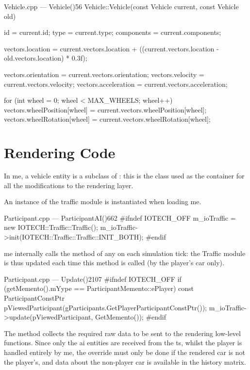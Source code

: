 \begin{codelist}{Vehicle.cpp --- Vehicle()}{56}
Vehicle::Vehicle(const Vehicle current, const Vehicle old) {
    id         = current.id;
    type       = current.type;
    components = current.components;

    vectors.location = current.vectors.location + ((current.vectors.location - old.vectors.location) * 0.3f);

    vectors.orientation  = current.vectors.orientation;
    vectors.velocity     = current.vectors.velocity;
    vectors.acceleration = current.vectors.acceleration;

    for (int wheel = 0; wheel < MAX_WHEELS; wheel++) {
        vectors.wheelPosition[wheel] = current.vectors.wheelPosition[wheel];
        vectors.wheelRotation[wheel] = current.vectors.wheelRotation[wheel];
    }
}
\end{codelist}

\section{Rendering Code}\label{sc:integration:renderingcode}

In \gls{me}, a vehicle entity is a subclass of : this is the class used as the container for all the modifications to the rendering layer.

An instance of the traffic module is instantiated when loading \gls{me}.

\begin{codelist}{Participant.cpp --- ParticipantAI()}{662}
#ifndef IOTECH_OFF
	m_ioTraffic = new IOTECH::Traffic::Traffic();
	m_ioTraffic->init(IOTECH::Traffic::Traffic::INIT_BOTH);
#endif
\end{codelist}

\gls{me} internally calls the  method of any  on each simulation tick: the Traffic module is thus updated each time this method is called (by the player's car only).

\begin{codelist}{Participant.cpp --- Update()}{2107}
#ifndef IOTECH_OFF
	if (getMemento().mYype == ParticipantMemento::ePlayer) {
		const ParticipantConstPtr pViewedParticipant(gParticipants.GetPlayerParticipantConstPtr());
		m_ioTraffic->update(pViewedParticipant, GetMemento());
	}
#endif
\end{codelist}

The  method collects the required raw data to be sent to the rendering low-level functions. Since only the \gls{ai} entities are received from the \gls{ts}, whilst the player is handled entirely by \gls{me}, the override must only be done if the rendered car is not the player's, and data about the non-player car is available in the history matrix.

